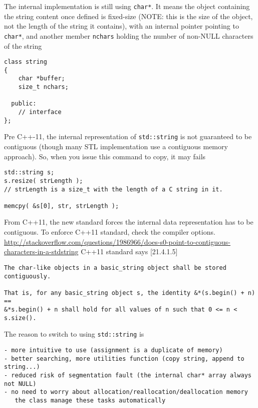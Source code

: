 \begin{mdframed}

The internal implementation is still using \verb!char*!.
It means the  object containing the string content once defined is fixed-size
(NOTE: this is the size of the object, not the length of the string it
contains), with an internal pointer pointing to \verb!char*!, and another member
\verb!nchars! holding the number of non-NULL characters of the string
\begin{verbatim}
class string
{
    char *buffer;
    size_t nchars;

  public:
    // interface
};
\end{verbatim}

Pre C++-11, the internal representation of \verb!std::string! is not guaranteed
to be contiguous (though many STL implementation use a contiguous memory
approach). So, when you issue this command to copy, it may fails
\begin{verbatim}
std::string s;
s.resize( strLength );  
// strLength is a size_t with the length of a C string in it. 

memcpy( &s[0], str, strLength );
\end{verbatim}

From C++11, the new standard forces the internal data representation has to be
contiguous. To enforce C++11 standard, check the compiler options.
\url{http://stackoverflow.com/questions/1986966/does-s0-point-to-contiguous-characters-in-a-stdstring}
C++11 standard says [21.4.1.5]
\begin{verbatim}
The char-like objects in a basic_string object shall be stored contiguously.

That is, for any basic_string object s, the identity &*(s.begin() + n) ==
&*s.begin() + n shall hold for all values of n such that 0 <= n < s.size().
\end{verbatim}

\end{mdframed}

The reason to switch to using \verb!std::string! is 
\begin{verbatim}
- more intuitive to use (assignment is a duplicate of memory)
- better searching, more utilities function (copy string, append to string...)
- reduced risk of segmentation fault (the internal char* array always not NULL)
- no need to worry about allocation/reallocation/deallocation memory
   the class manage these tasks automatically
\end{verbatim}

